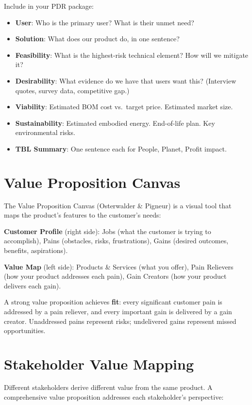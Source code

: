 \documentclass[11pt,letterpaper,twoside,openany]{book}
\begin{document}
\begin{greenshieldbox}
Include in your PDR package:
\begin{itemize}[nosep,leftmargin=1.5em]
\item \textbf{User}: Who is the primary user? What is their unmet need?
\item \textbf{Solution}: What does our product do, in one sentence?
\item \textbf{Feasibility}: What is the highest-risk technical element? How will we mitigate it?
\item \textbf{Desirability}: What evidence do we have that users want this? (Interview quotes, survey data, competitive gap.)
\item \textbf{Viability}: Estimated BOM cost vs.\ target price. Estimated market size.
\item \textbf{Sustainability}: Estimated embodied energy. End-of-life plan. Key environmental risks.
\item \textbf{TBL Summary}: One sentence each for People, Planet, Profit impact.
\end{itemize}
\end{greenshieldbox}

\section{Value Proposition Canvas}
The Value Proposition Canvas (Osterwalder \& Pigneur) is a visual tool that maps the product's features to the customer's needs:

\textbf{Customer Profile} (right side): Jobs (what the customer is trying to accomplish), Pains (obstacles, risks, frustrations), Gains (desired outcomes, benefits, aspirations).

\textbf{Value Map} (left side): Products \& Services (what you offer), Pain Relievers (how your product addresses each pain), Gain Creators (how your product delivers each gain).

A strong value proposition achieves \textbf{fit}: every significant customer pain is addressed by a pain reliever, and every important gain is delivered by a gain creator. Unaddressed pains represent risks; undelivered gains represent missed opportunities.

\section{Stakeholder Value Mapping}
Different stakeholders derive different value from the same product. A comprehensive value proposition addresses each stakeholder's perspective:
\end{document}
